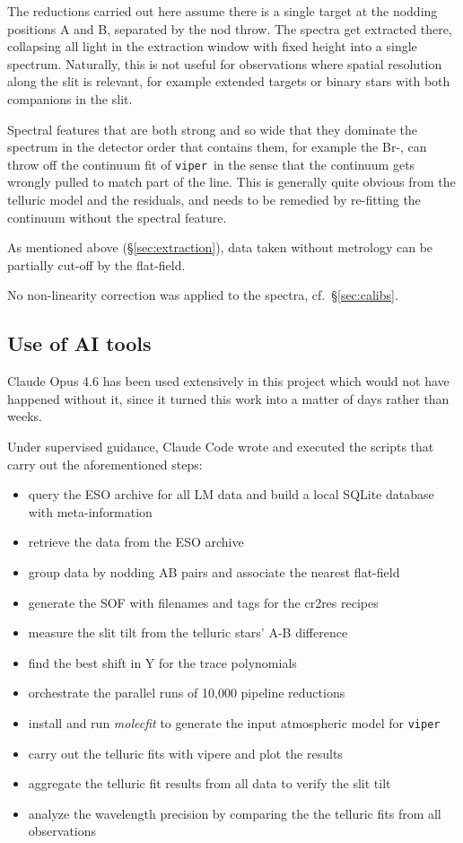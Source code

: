 \documentclass{aa}
\newcommand{\viper}{\texttt{viper}}
\begin{document}
The reductions carried out here assume there is a single target at the 
nodding positions A and B, separated by the nod throw. 
The spectra get extracted there, collapsing
all light in the extraction window with fixed height into a single spectrum.
Naturally, this
is not useful for observations where spatial resolution along the slit is relevant,
for example extended targets or binary stars with both companions in
the slit.

Spectral features that are both strong and so wide that they dominate
the spectrum in the detector order that contains them, for example the
Br-, can throw off
the continuum fit of \viper\, in the sense that the continuum gets wrongly
pulled to match part of the line. This is generally quite obvious from the telluric model and the
residuals, and needs to be remedied by re-fitting the continuum without
the spectral feature.

As mentioned above (\S \ref{sec:extraction}),
 data taken without metrology can be partially cut-off by the flat-field.
 
No non-linearity correction was applied to the spectra, cf.~\S \ref{sec:calibs}.

\subsection{Use of AI tools}
\label{sec:ai}

Claude Opus 4.6 \citep{claude_opus46} has been used extensively in this project
which would not have happened without it, since it turned this work into a matter of days rather than weeks.

Under supervised
guidance, Claude Code wrote and executed the scripts that carry out the aforementioned steps:
\begin{itemize}
\item query the ESO archive for all LM data and build a local SQLite database with meta-information
\item retrieve the data from the ESO archive
\item group data by nodding AB pairs and associate the nearest flat-field
\item generate the SOF with filenames and tags for the cr2res recipes
\item measure the slit tilt from the telluric stars' A-B difference
\item find the best shift in Y for the trace polynomials
\item orchestrate the parallel runs of 10,000 pipeline reductions
\item install and run \emph{molecfit} to generate the input atmospheric model for \viper
\item carry out the telluric fits with vipere and plot the results
\item aggregate the telluric fit results from all data to verify the slit tilt
\item analyze the wavelength precision by comparing the the telluric fits from all observations
\end{itemize}
\end{document}
